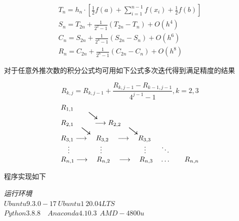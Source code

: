 \documentclass[11pt, a4paper, oneside]{ctexart}
\begin{document}
{{{{{    \vspace{-14mm}
    \begin{center}
        $$
            \begin{array}{c}
            T_{n}=h_{n} \cdot\left[\frac{1}{2} f(a)+\sum_{i=1}^{n-1} f\left(x_{i}\right)+\frac{1}{2} f(b)\right] \\
            S_{n}=T_{2 n}+\frac{1}{2^{2}-1}\left(T_{2 n}-T_{n}\right)+O\left(h^{4}\right) \\
            C_{n}=S_{2 n}+\frac{1}{2^{4}-1}\left(S_{2 n}-S_{n}\right)+O\left(h^{6}\right) \\
            R_{n}=C_{2 n}+\frac{1}{2^{6}-1}\left(C_{2 n}-C_{n}\right)+O\left(h^{8}\right)
            \end{array}
        $$    
        \end{center}
    
    
        对于任意外推次数的积分公式均可用如下公式多次迭代得到满足精度的结果
    
    \begin{center}\vspace{-13mm}
        $$
R_{k, j}=R_{k, j-1}+\frac{R_{k, j-1}-R_{k-1, j-1}}{4^{j-1}-1}, k=2,3
$$
        $$
        \begin{array}{l}\vspace{0mm}
        {R_{1,1}}_{_{_{_{\qquad\scaleto{\searrow }{10pt}}}}}  \\
        {R_{2,1}}_{_{_{_{\quad\scaleto{\searrow }{10pt}}}}} \stackrel{ }{\longrightarrow} {R_{2,2}}_{_{_{_{\quad\scaleto{\searrow }{10pt}}}}} \\
        R_{3,1} \longrightarrow \quad R_{3,2}\quad \longrightarrow \quad R_{3,3} \\
        \quad\vdots \qquad\qquad\  \vdots \qquad\qquad\qquad \vdots \qquad \ddots \\
        R_{n, 1} \longrightarrow \quad R_{n, 2} \quad\longrightarrow \quad R_{n, 3} \quad \ldots \qquad R_{n, n}
        \end{array}
        $$
    \end{center}

    }
    
}

\vspace{30mm}

{
    程序实现如下
    
    
    \begin{flushright}
    \scriptsize\emph{运行环境\\$Ubuntu 9.3.0-17\ Ubuntu1~20.04LTS$}\\
    \scriptsize\emph{$Python 3.8.8$\ \ $Anaconda 4.10.3\ \  AMD-4800u$}
        

\end{flushright}}}}}
\end{document}
